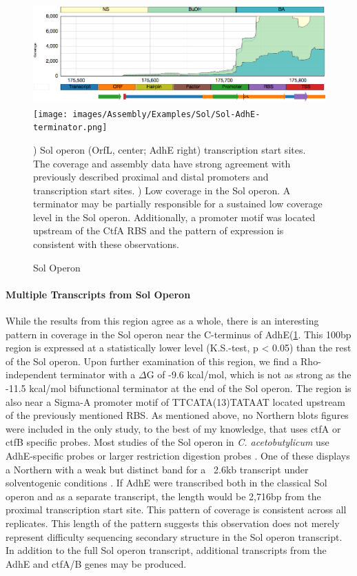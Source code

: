 \begin{figure}
\small
{\includegraphics[width=\textwidth,height=1.5in]{images/Assembly/Examples/Sol/Sol-TSS.png}
\label{fig:3a}}
{\texttt{[image: images/Assembly/Examples/Sol/Sol-AdhE-terminator.png]}
\label{fig:3b}}
\caption{Sol Operon}
) Sol operon (OrfL, center; AdhE right) transcription start sites. The coverage and assembly data have strong agreement with previously described proximal and distal promoters and transcription start sites. ) Low coverage in the Sol operon. A terminator may be partially responsible for a sustained low coverage level in the Sol operon. Additionally, a promoter motif was located upstream of the CtfA RBS and the pattern of expression is consistent with these observations.
\end{figure}

\paragraph{Multiple Transcripts from Sol Operon}
While the results from this region agree as a whole, there is an interesting pattern in coverage in the Sol operon near the C-terminus of AdhE(\ref{fig:3b}. This 100bp region is expressed at a statistically lower level (K.S.-test, p < 0.05) than the rest of the Sol operon. Upon further examination of this region, we find a Rho-independent terminator with a \(\Delta\)G of -9.6 kcal/mol, which is not as strong as the -11.5 kcal/mol bifunctional terminator at the end of the Sol operon. The region is also near a Sigma-A promoter motif of TTCATA(13)TATAAT located upstream of the previously mentioned RBS. As mentioned above, no Northern blots figures were included in the only study, to the best of my knowledge, that uses ctfA or ctfB specific probes\cite{65}. Most studies of the Sol operon in \textit{C. acetobutylicum} use AdhE-specific probes or larger restriction digestion probes \cite{63,68,70}. One of these displays a Northern with a weak but distinct band for a ~2.6kb transcript under solventogenic conditions \cite{68}. If AdhE were transcribed both in the classical Sol operon and as a separate transcript, the length would be 2,716bp from the proximal transcription start site. This pattern of coverage is consistent across all replicates. This length of the pattern suggests this observation does not merely represent difficulty sequencing secondary structure in the Sol operon transcript. In addition to the full Sol operon transcript, additional transcripts from the AdhE and ctfA/B genes may be produced.


